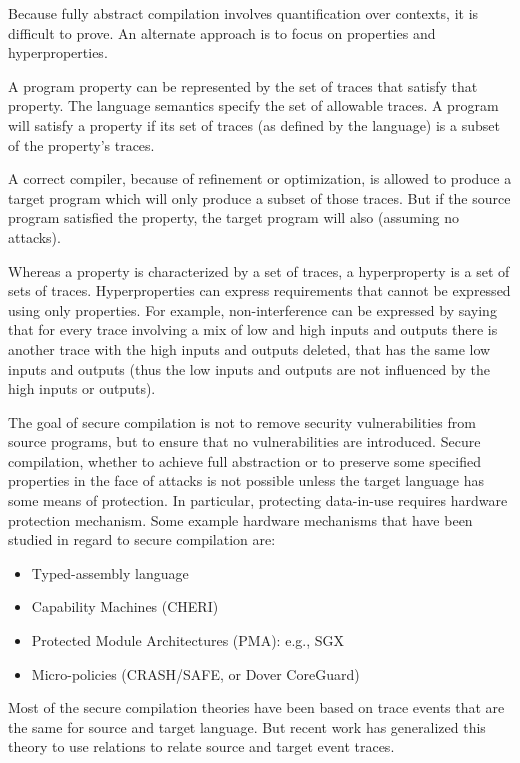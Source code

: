 Because fully abstract compilation involves quantification over contexts, it is difficult to prove. An alternate approach is to focus on properties and hyperproperties.\autocite{20210614:clarkson}

A program property can be represented by the set of traces that satisfy that property. The language semantics specify the set of allowable traces. A program will satisfy a property if its set of traces (as defined by the language) is a subset of the property's traces.

A correct compiler, because of refinement or optimization, is allowed to produce a target program which will only produce a subset of those traces. But if the source program satisfied the property, the target program will also (assuming no attacks).

Whereas a property is characterized by a set of traces, a hyperproperty is a set of sets of traces. Hyperproperties can express requirements that cannot be expressed using only properties. For example, non-interference can be expressed by saying that for every trace involving a mix of low and high inputs and outputs there is another trace with the high inputs and outputs deleted, that has the same low inputs and outputs (thus the low inputs and outputs are not influenced by the high inputs or outputs).

The goal of secure compilation is not to remove security vulnerabilities from source programs, but to ensure that no vulnerabilities are introduced. Secure compilation, whether to achieve full abstraction or to preserve some specified properties in the face of attacks is not possible unless the target language has some means of protection. In particular, protecting data-in-use requires hardware protection mechanism. Some example hardware mechanisms that have been studied in regard to secure compilation are:\autocites{20210614:busi}{20210614:patrignani}
\begin{itemize}
	\item Typed-assembly language
	\item Capability Machines (CHERI)
	\item Protected Module Architectures (PMA): e.g., SGX
	\item Micro-policies (CRASH/SAFE, or Dover CoreGuard)
\end{itemize}

Most of the secure compilation theories have been based on trace events that are the same for source and target language. But recent work has generalized this theory to use relations to relate source and target event traces.\autocite{20210614:abate}

